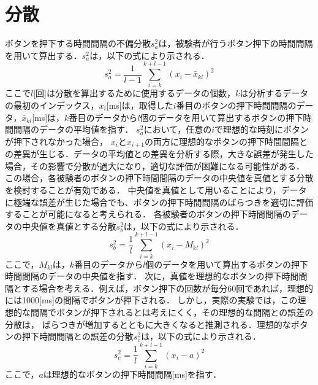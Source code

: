 \section{分散}
ボタンを押下する時間間隔の不偏分散$s^2_{a}$は，被験者が行うボタン押下の時間間隔を用いて算出する．$s^2_{a}$は，以下の式により示される．
\begin{equation}
  s^2_a = \frac{1}{l-1} \sum_{i=k}^{k+l-1} (x_i - \bar{x}_{kl})^2
\end{equation}
ここで$l$[回]は分散を算出するために使用するデータの個数，$k$は分析するデータの最初のインデックス，$x_{i}$[ms]は，取得した$i$番目のボタンの押下時間間隔のデータ，$\bar{x}_{kl}$[ms]は，$k$番目のデータから$l$個のデータを用いて算出するボタンの押下時間間隔のデータの平均値を指す．
$s^2_{a}$において，任意の$i$で理想的な時刻にボタンが押下されなかった場合，
$x_{i}$と$x_{i+1}$の両方に理想的なボタンの押下時間間隔との差異が生じる．データの平均値との差異を分析する際，大きな誤差が発生した場合，その影響で分散が過大になり，適切な評価が困難になる可能性がある．
この場合，各被験者のボタンの押下時間間隔のデータの中央値を真値とする分散を検討することが有効である．
中央値を真値として用いることにより，データに極端な誤差が生じた場合でも、ボタンの押下時間間隔のばらつきを適切に評価することが可能になると考えられる．
各被験者のボタンの押下時間間隔のデータの中央値を真値とする分散$s^2_{b}$は，以下の式により示される．
\begin{equation}
  s^2_b = \frac{1}{l} \sum_{i=k}^{k+l-1} (x_i - M_{kl})^2
\end{equation}
ここで，$M_{kl}$は，$k$番目のデータから$l$個のデータを用いて算出するボタンの押下時間間隔のデータの中央値を指す．
次に，真値を理想的なボタンの押下時間間隔とする場合を考える．例えば，ボタン押下の回数が毎分60回であれば，理想的には1000[ms]の間隔でボタンが押下される．
しかし，実際の実験では，この理想的な間隔でボタンが押下されるとは考えにくく，その理想的な間隔との誤差の分散は，
ばらつきが増加するとともに大きくなると推測される．理想的なボタンの押下時間間隔との誤差の分散$s^2_{c}$は，以下の式により示される．
\begin{equation}
  s^2_c = \frac{1}{l} \sum_{i=k}^{k+l-1} (x_i - a)^2
\end{equation}
ここで，$a$は理想的なボタンの押下時間間隔[ms]を指す．
